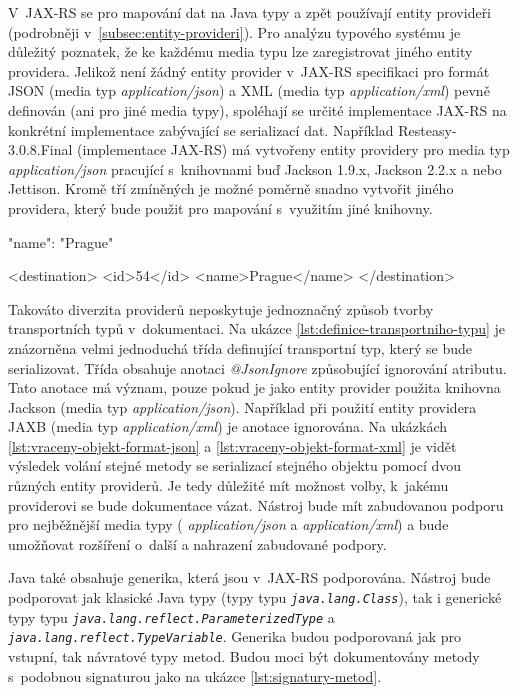 \documentclass[11pt,twoside,a4paper]{book}
\begin{document}
V~JAX-RS se pro mapování dat na Java typy a zpět používají entity provideři (podrobněji
v~\ref{subsec:entity-provideri}). Pro analýzu typového systému je důležitý poznatek, že ke každému media
typu lze zaregistrovat jiného entity providera. Jelikož není žádný entity provider v~JAX-RS
specifikaci pro formát JSON (media typ {\em application/json}) a XML (media typ
{\em application/xml}) pevně definován (ani pro jiné media typy), spoléhají se
určité implementace JAX-RS na konkrétní implementace zabývající se serializací dat. Například
Resteasy-3.0.8.Final \cite{RESTEasyHome} (implementace JAX-RS) má vytvořeny entity providery
pro media typ {\em application/json} pracující s~knihovnami buď Jackson 1.9.x, Jackson 2.2.x a
nebo Jettison. Kromě tří zmíněných je možné poměrně snadno vytvořit jiného providera, který
bude použit pro mapování s~využitím jiné knihovny. 

\begin{code}[frame=single,caption={Vrácený objekt při použití media typu application/json
},label={lst:vraceny-objekt-format-json}]
{
    "name": "Prague"
}
\end{code}

\begin{code}[frame=single,caption={Vrácený objekt při použití media typu
application/xml},label={lst:vraceny-objekt-format-xml}] 
<destination>
    <id>54</id> 
    <name>Prague</name>
</destination>
\end{code}

Takováto diverzita providerů neposkytuje jednoznačný způsob tvorby transportních
typů v~dokumentaci. Na ukázce \ref{lst:definice-transportniho-typu} je
znázorněna velmi jednoduchá třída definující transportní typ, který se bude
serializovat. Třída obsahuje anotaci {\em @JsonIgnore} způsobující ignorování
atributu. Tato anotace má význam, pouze pokud je jako entity provider použita
knihovna Jackson (media typ {\em application/json}).
Například při použití entity providera JAXB (media typ {\em application/xml}) je
anotace ignorována. Na ukázkách \ref{lst:vraceny-objekt-format-json} a
\ref{lst:vraceny-objekt-format-xml} je vidět výsledek volání stejné metody se
serializací stejného objektu pomocí dvou různých entity providerů. Je tedy
důležité mít možnost volby, k~jakému providerovi se bude dokumentace vázat.
Nástroj bude mít zabudovanou podporu pro nejběžnější media typy ({\em
application/json} a {\em application/xml}) a bude umožňovat rozšíření o~další a
nahrazení zabudované podpory.

Java také obsahuje generika, která jsou v~JAX-RS podporována. Nástroj bude
podporovat jak klasické Java typy (typy typu {\em \nolinkurl{java.lang.Class}}),
tak i generické typy typu {\em \nolinkurl{java.lang.reflect.ParameterizedType}}
a {\em \nolinkurl{java.lang.reflect.TypeVariable}}. Generika budou podporovaná
jak pro vstupní, tak návratové typy metod. Budou moci být dokumentovány metody
s~podobnou signaturou jako na ukázce \ref{lst:signatury-metod}.
\end{document}
